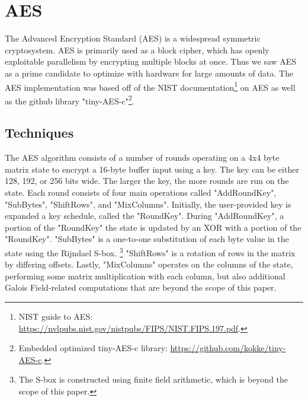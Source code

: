 \section{AES}
The Advanced Encryption Standard (AES) is a widespread symmetric cryptosystem. AES is primarily used as a block cipher, which has openly exploitable parallelism by encrypting multiple blocks at once. Thus we saw AES as a prime candidate to optimize with hardware for large amounts of data. The AES implementation was based off of the NIST documentation\footnote{NIST guide to AES: \url{https://nvlpubs.nist.gov/nistpubs/FIPS/NIST.FIPS.197.pdf}.} on AES as well as the github library "tiny-AES-c"\footnote{Embedded optimized tiny-AES-c library: \url{https://github.com/kokke/tiny-AES-c}.}.

\subsection{Techniques}
The AES algorithm consists of a number of rounds operating on a 4x4 byte matrix state to encrypt a 16-byte buffer input using a key. The key can be either 128, 192, or 256 bits wide. The larger the key, the more rounds are run on the state. Each round consists of four main operations called "AddRoundKey", "SubBytes", "ShiftRows", and "MixColumns".
Initially, the user-provided key is expanded a key schedule, called the "RoundKey".
During "AddRoundKey", a portion of the "RoundKey" the state is updated by an XOR with a portion of the "RoundKey".
"SubBytes" is a one-to-one substitution of each byte value in the state using the Rijndael S-box. \footnote{The S-box is constructed using finite field arithmetic, which is beyond the scope of this paper.}
"ShiftRows" is a rotation of rows in the matrix by differing offsets.
Lastly, "MixColumns" operates on the columns of the state, performing some matrix multiplication with each column, but also additional Galois Field-related computations that are beyond the scope of this paper.

